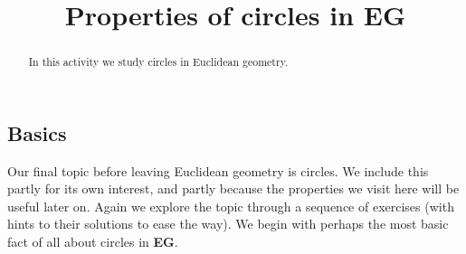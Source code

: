 \documentclass{ximera}
\title{Properties of circles in \textbf{EG}}
\begin{document}
\begin{abstract}
In this activity we study circles in Euclidean geometry.
\end{abstract}
\maketitle


\subsection*{Basics}

Our final topic before leaving Euclidean geometry is circles. We
include this partly for its own interest, and partly because the
properties we visit here will be useful later on. Again we explore the
topic through a sequence of exercises (with hints to their solutions
to ease the way). We begin with perhaps the most basic fact of all
about circles in \textbf{EG}.
\end{document}
